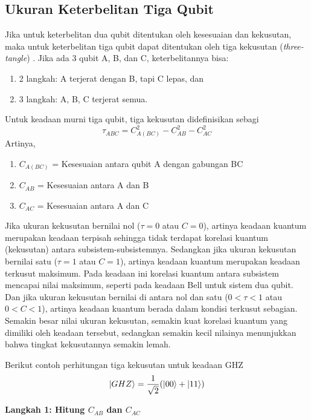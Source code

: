 \subsection{Ukuran Keterbelitan Tiga Qubit}
Jika untuk keterbelitan dua qubit ditentukan oleh kesesuaian dan kekusutan, maka untuk keterbelitan tiga qubit dapat ditentukan oleh tiga kekusutan (\textit{three-tangle}) \cite{coffman2000distributed}. Jika ada 3 qubit A, B, dan C, keterbelitannya bisa:
\begin{enumerate}
	\item 2 langkah: A terjerat dengan B, tapi C lepas, dan
	\item 3 langkah: A, B, C terjerat semua.
\end{enumerate}
Untuk keadaan murni tiga qubit, tiga kekusutan didefinisikan sebagi
\begin{equation}
	\tau_{ABC} = C^2_{A(BC)} - C^2_{AB} - C^2_{AC}
\end{equation}
Artinya,
\begin{enumerate}
	\item $C_{A(BC)}$ = Kesesuaian antara qubit A dengan gabungan BC
	\item $C_{AB}$ = Kesesuaian antara A dan B
	\item $C_{AC}$ = Kesesuaian antara A dan C
\end{enumerate}
Jika ukuran kekusutan bernilai nol (\(\tau=0\) atau \(C=0\)), artinya keadaan kuantum merupakan keadaan terpisah sehingga tidak terdapat korelasi kuantum (kekusutan) antara subsistem-subsistemnya. Sedangkan jika ukuran kekusutan bernilai satu (\(\tau=1\) atau \(C=1\)), artinya keadaan kuantum merupakan keadaan terkusut maksimum. Pada keadaan ini korelasi kuantum antara subsistem mencapai nilai maksimum, seperti pada keadaan Bell untuk sistem dua qubit. Dan jika ukuran kekusutan bernilai di antara nol dan satu (\(0<\tau<1\) atau \(0<C<1\)), artinya keadaan kuantum berada dalam kondisi terkusut sebagian. Semakin besar nilai ukuran kekusutan, semakin kuat korelasi kuantum yang dimiliki oleh keadaan tersebut, sedangkan semakin kecil nilainya menunjukkan bahwa tingkat kekusutannya semakin lemah.
\par
Berikut contoh perhitungan tiga kekusutan untuk keadaan GHZ
\begin{equation*}
	\ket{GHZ}=\frac{1}{\sqrt{2}}(\ket{00}+\ket{11})
\end{equation*}

\par
\textbf{Langkah 1: Hitung $C_{AB}$ dan $C_{AC}$}

